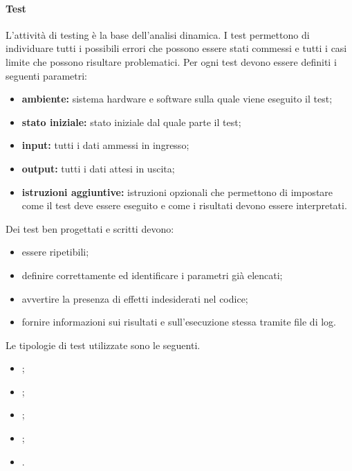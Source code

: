 \paragraph{Test}
\label{Test}
L'attività di testing è la base dell'analisi dinamica. I test permettono di individuare tutti i possibili errori che possono essere stati commessi e tutti i casi limite che possono risultare problematici. Per ogni test devono essere definiti i seguenti parametri:
\begin{itemize}
	\item \textbf{ambiente:} sistema hardware e software sulla quale viene eseguito il test;
	\item \textbf{stato iniziale:} stato iniziale dal quale parte il test;
	\item \textbf{input:} tutti i dati ammessi in ingresso;
	\item \textbf{output:} tutti i dati attesi in uscita;
	\item \textbf{istruzioni aggiuntive:} istruzioni opzionali che permettono di impostare come il test deve essere eseguito e come i risultati devono essere interpretati.
\end{itemize}
Dei test ben progettati e scritti devono:
\begin{itemize}
	\item essere ripetibili;
	\item definire correttamente ed identificare i parametri già elencati;
	\item avvertire la presenza di effetti indesiderati nel codice;
	\item fornire informazioni sui risultati e sull'esecuzione stessa tramite file di log.
\end{itemize}
Le tipologie di test utilizzate sono le seguenti.
\begin{itemize}
	\item {};
	\item {};
	\item {};
	\item {};
	\item {}.
\end{itemize}
